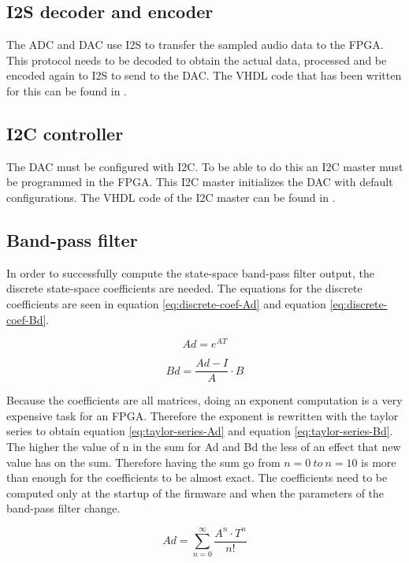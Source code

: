 \subsection{I2S decoder and encoder}
The ADC and DAC use I2S to transfer the sampled audio data to the FPGA. This protocol needs to be decoded to obtain the actual data, processed and be encoded again to I2S to send to the DAC. The VHDL code that has been written for this can be found in . 

\subsection{I2C controller}
The DAC must be configured with I2C. To be able to do this an I2C master must be programmed in the FPGA. This I2C master initializes the DAC with default configurations. The VHDL code of the I2C master can be found in . 

\subsection{Band-pass filter}
In order to successfully compute the state-space band-pass filter output, the discrete state-space coefficients are needed. The equations for the discrete coefficients are seen in equation \ref{eq:discrete-coef-Ad} and equation \ref{eq:discrete-coef-Bd}.

\begin{equation}
    Ad=e^{AT}
    \label{eq:discrete-coef-Ad}
\end{equation}

\begin{equation}
    Bd=\frac{Ad-I}{A}\cdot B
    \label{eq:discrete-coef-Bd}
\end{equation}

Because the coefficients are all matrices, doing an exponent computation is a very expensive task for an FPGA. Therefore the exponent is rewritten with the taylor series to obtain equation \ref{eq:taylor-series-Ad} and equation \ref{eq:taylor-series-Bd}. The higher the value of n in the sum for Ad and Bd the less of an effect that new value has on the sum. Therefore having the sum go from $n=0\ to\ n=10$ is more than enough for the coefficients to be almost exact. The coefficients need to be computed only at the startup of the firmware and when the parameters of the band-pass filter change. 

\begin{equation}
    Ad=\sum_{n=0}^{\infty}\frac{A^n\cdot T^n}{n!}
    \label{eq:taylor-series-Ad}
\end{equation}

